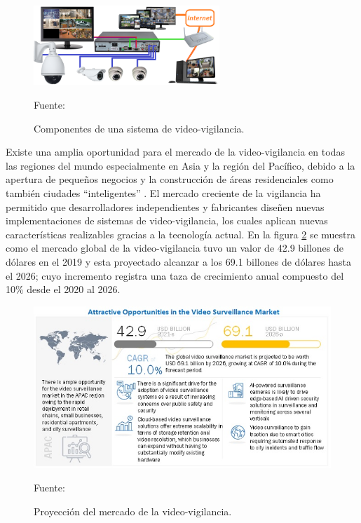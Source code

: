 \begin{figure}[H]
    \begin{center}
        \includegraphics[width=7cm]{img/capitulo_2/sis_videovigilancia.png}
    \end{center}
    \begin{center}
        \caption{Componentes de una sistema de video-vigilancia.}
        Fuente: \cite{videosurvellance}
        \label{fig:sistema_video_vigilancia}
    \end{center}
\end{figure}

Existe una amplia oportunidad para el mercado de la video-vigilancia en todas las regiones del mundo especialmente en Asia y la región del Pacífico, debido a la apertura de pequeños negocios y la construcción de áreas residenciales como también ciudades ``inteligentes'' \cite{marketsandmarkets:market-surveillance}. El mercado creciente de la vigilancia ha permitido que desarrolladores independientes y fabricantes diseñen nuevas implementaciones de sistemas de video-vigilancia, los cuales aplican nuevas características realizables gracias a la tecnología actual. En la figura \ref{fig:surveillance-market} se muestra como el mercado global de la video-vigilancia tuvo un valor de 42.9 billones de dólares en el 2019 y esta proyectado alcanzar a los 69.1 billones de dólares hasta el 2026; cuyo incremento registra una taza de crecimiento anual compuesto del 10\% desde el 2020 al 2026. \cite{marketsandmarkets:market-surveillance}\\

\begin{figure}[H]
    \begin{center}
        \includegraphics[width=12cm]{img/capitulo_2/surveillance-market.jpg}
    \end{center}
    \begin{center}
        \caption{Proyección del mercado de la video-vigilancia.}
        Fuente: \cite{marketsandmarkets:market-surveillance}
        \label{fig:surveillance-market}
    \end{center}
\end{figure}

